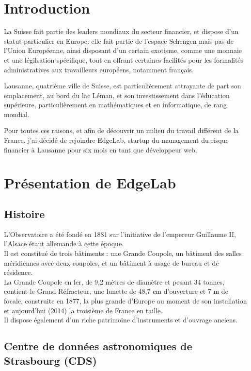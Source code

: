 \documentclass[a4paper,french,12pt]{article}
\begin{document}
\newpage

\section{Introduction}

	La Suisse fait partie des leaders mondiaux du secteur financier, et dispose d'un statut particulier en Europe: elle fait partie de l'espace Schengen mais pas de l'Union Européenne, ainsi disposant d'un certain exotisme, comme une monnaie et une légilsation spécifique, tout en offrant certaines facilités pour les formalités administratives aux travailleurs européens, notamment français.
	
	
	Lausanne, quatrième ville de Suisse, est particulièrement attrayante de part son emplacement, au bord du lac Léman, et son investissement dans l'éducation supérieure, particulièrement en mathématiques et en informatique, de rang mondial.

	Pour toutes ces raisons, et afin de découvrir un milieu du travail différent de la France, j'ai décidé de rejoindre EdgeLab, startup du management du risque financier à Lausanne pour six mois en tant que développeur web.

\section{Présentation de EdgeLab}

	\subsection{Histoire}
		L'Observatoire a été fondé en 1881 sur l'initiative de l'empereur Guillaume II, l'Alsace étant allemande
		à cette époque.\\
		Il est constitué de trois bâtiments : une Grande Coupole, un bâtiment des salles méridiennes avec deux coupoles,
		et un bâtiment à usage de bureau et de résidence.\\
		La Grande Coupole en fer, de 9,2 mètres de diamètre et pesant 34 tonnes, contient le Grand Réfracteur,
		une lunette de 48,7 cm d'ouverture et 7 m de focale, construite en 1877, la plus grande d'Europe
		au moment de son installation et aujourd'hui (2014) la troisième de France en taille.\\
		Il dispose également d’un riche patrimoine d’instruments et d’ouvrage anciens.

	\subsection{Centre de données astronomiques de Strasbourg (CDS)}
\end{document}
